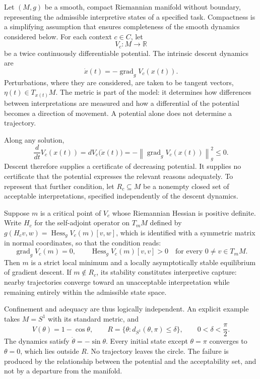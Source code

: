 \documentclass[11pt]{article}
\begin{document}
Let $(M,g)$ be a smooth, compact Riemannian manifold without boundary, representing the admissible interpretive states of a specified task. Compactness is a simplifying assumption that ensures completeness of the smooth dynamics considered below. For each context $c\in C$, let
\[
V_c\colon M\longrightarrow\mathbb{R}
\]
be a twice continuously differentiable potential. The intrinsic descent dynamics are
\[
\dot{x}(t)=-\operatorname{grad}_g V_c(x(t)).
\]
Perturbations, where they are considered, are taken to be tangent vectors, $\eta(t)\in T_{x(t)}M$. The metric is part of the model: it determines how differences between interpretations are measured and how a differential of the potential becomes a direction of movement. A potential alone does not determine a trajectory.

Along any solution,
\[
\frac{d}{dt}V_c(x(t))
=
dV_c\bigl(\dot{x}(t)\bigr)
=
-\left\|\operatorname{grad}_g V_c(x(t))\right\|_g^2
\leq 0.
\]
Descent therefore supplies a certificate of decreasing potential. It supplies no certificate that the potential expresses the relevant reasons adequately. To represent that further condition, let $R_c\subseteq M$ be a nonempty closed set of acceptable interpretations, specified independently of the descent dynamics.

Suppose $m$ is a critical point of $V_c$ whose Riemannian Hessian is positive definite. Write $H_c$ for the self-adjoint operator on $T_mM$ defined by $g(H_cv,w)=\operatorname{Hess}_g V_c(m)[v,w]$, which is identified with a symmetric matrix in normal coordinates, so that the condition reads:
\[
\operatorname{grad}_g V_c(m)=0,
\qquad
\operatorname{Hess}_g V_c(m)[v,v]>0
\quad
\text{for every }0\neq v\in T_mM.
\]
Then $m$ is a strict local minimum and a locally asymptotically stable equilibrium of gradient descent. If $m\notin R_c$, its stability constitutes interpretive capture: nearby trajectories converge toward an unacceptable interpretation while remaining entirely within the admissible state space.

Confinement and adequacy are thus logically independent. An explicit example takes $M=S^1$ with its standard metric, and
\[
V(\theta)=1-\cos\theta,
\qquad
R=\{\theta:d_{S^1}(\theta,\pi)\leq\delta\},
\qquad
0<\delta<\frac{\pi}{2}.
\]
The dynamics satisfy $\dot{\theta}=-\sin\theta$. Every initial state except $\theta=\pi$ converges to $\theta=0$, which lies outside $R$. No trajectory leaves the circle. The failure is produced by the relationship between the potential and the acceptability set, and not by a departure from the manifold.
\end{document}
